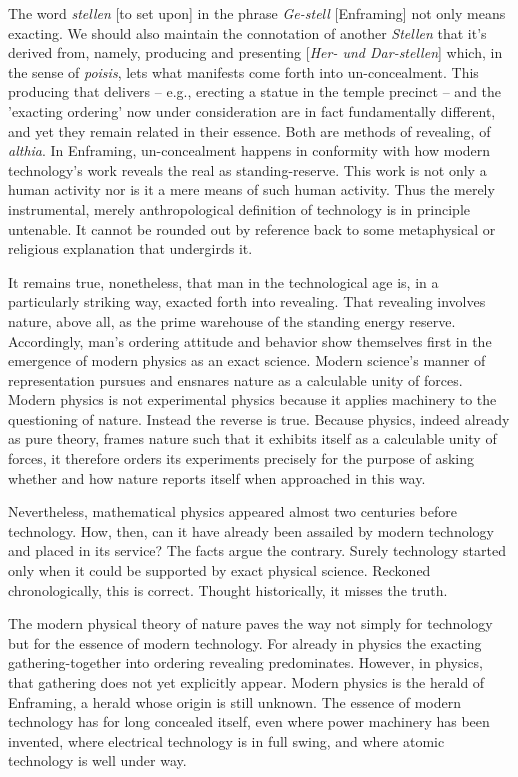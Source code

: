 \documentclass[12pt]{article}
\begin{document}
The word \textit{stellen} [to set upon] in the phrase \textit{Ge-stell} [Enframing] not only means exacting. We should also maintain the connotation of another \textit{Stellen} that it's derived from, namely, producing and presenting [\textit{Her- und Dar-stellen}] which, in the sense of \textit{poisis}, lets what manifests come forth into un-concealment. This producing that delivers -- e.g., erecting a statue in the temple precinct -- and the 'exacting ordering' now under consideration are in fact fundamentally different, and yet they remain related in their essence. Both are methods of revealing, of \textit{althia}. In Enframing, un-concealment happens in conformity with how modern technology's work reveals the real as standing-reserve. This work is not only a human activity nor is it a mere means of such human activity. Thus the merely instrumental, merely anthropological definition of technology is in principle untenable. It cannot be rounded out by reference back to some metaphysical or religious explanation that undergirds it.

It remains true, nonetheless, that man in the technological age is, in a particularly striking way, exacted forth into revealing. That revealing involves nature, above all, as the prime warehouse of the standing energy reserve. Accordingly, man's ordering attitude and behavior show themselves first in the emergence of modern physics as an exact science. Modern science's manner of representation pursues and ensnares nature as a calculable unity of forces. Modern physics is not experimental physics because it applies machinery to the questioning of nature. Instead the reverse is true. Because physics, indeed already as pure theory, frames nature such that it exhibits itself as a calculable unity of forces, it therefore orders its experiments precisely for the purpose of asking whether and how nature reports itself when approached in this way.

Nevertheless, mathematical physics appeared almost two centuries before technology. How, then, can it have already been assailed by modern technology and placed in its service? The facts argue the contrary. Surely technology started only when it could be supported by exact physical science. Reckoned chronologically, this is correct. Thought historically, it misses the truth.

The modern physical theory of nature paves the way not simply for technology but for the essence of modern technology. For already in physics the exacting gathering-together into ordering revealing predominates. However, in physics, that gathering does not yet explicitly appear. Modern physics is the herald of Enframing, a herald whose origin is still unknown. The essence of modern technology has for long concealed itself, even where power machinery has been invented, where electrical technology is in full swing, and where atomic technology is well under way.
\end{document}
